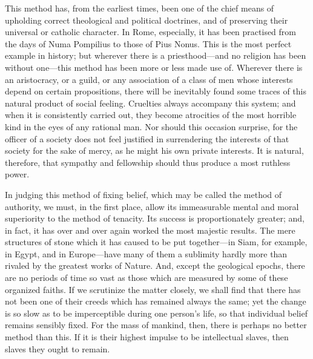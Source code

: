 This method has, from the earliest times, been one of the chief means
of upholding correct theological and political doctrines, and of
preserving their universal or catholic character. In Rome, especially,
it has been practised from the days of Numa Pompilius to those of Pius
Nonus. This is the most perfect example in history; but wherever there
is a priest\-hood---and no religion has been without one---this method
has been more or less made use of. Wherever there is an aristocracy,
or a guild, or any association of a class of men whose interests
depend on certain propositions, there will be inevitably found some
traces of this natural product of social feeling. Cruelties always
accompany this system; and when it is consistently carried out, they
become atrocities of the most horrible kind in the eyes of any
rational man. Nor should this occasion surprise, for the officer of a
society does not feel justified in surrendering the interests of that
society for the sake of mercy, as he might his own private
interests. It is natural, therefore, that sympathy and fellowship
should thus produce a most ruthless power.

In judging this method of fixing belief, which may be called the
method of authority, we must, in the first place, allow its
immeasurable mental and moral superiority to the method of tenacity.
Its success is proportionately greater; and, in fact, it has over and
over again worked the most majestic results. The mere structures of
stone which it has caused to be put to\-geth\-er---in Siam, for
example, in Egypt, and in Eu\-rope---have many of them a sublimity
hardly more than rivaled by the greatest works of Nature. And, except
the geological epochs, there are no periods of time so vast as those
which are measured by some of these organized faiths. If we scrutinize
the matter closely, we shall find that there has not been one of their
creeds which has remained always the same; yet the change is so slow
as to be imperceptible during one person's life, so that individual
belief remains sensibly fixed. For the mass of mankind, then, there is
perhaps no better method than this. If it is their highest impulse to
be intellectual slaves, then slaves they ought to remain.

